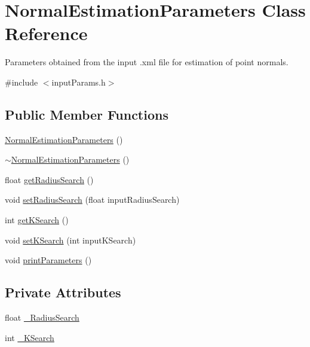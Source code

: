 \hypertarget{classNormalEstimationParameters}{\section{Normal\-Estimation\-Parameters Class Reference}
\label{classNormalEstimationParameters}
}


Parameters obtained from the input .xml file for estimation of point normals.  




{\ttfamily \#include $<$input\-Params.\-h$>$}

\subsection*{Public Member Functions}
\begin{DoxyCompactItemize}
\item 
\hyperlink{classNormalEstimationParameters_afdc5ed50adc78957f6e1473b46fdc027}{Normal\-Estimation\-Parameters} ()
\item 
\hyperlink{classNormalEstimationParameters_ae69baf3578ee90eee275e8557b7ab785}{$\sim$\-Normal\-Estimation\-Parameters} ()
\item 
float \hyperlink{classNormalEstimationParameters_ac85dfb4402e619e231252a550885e03e}{get\-Radius\-Search} ()
\item 
void \hyperlink{classNormalEstimationParameters_a09de127988c26f63802e5684ac820616}{set\-Radius\-Search} (float input\-Radius\-Search)
\item 
int \hyperlink{classNormalEstimationParameters_a6d60aefc1bf365dfb3535ca461f1ff42}{get\-K\-Search} ()
\item 
void \hyperlink{classNormalEstimationParameters_a2e155df55266a320e301353a29fdd545}{set\-K\-Search} (int input\-K\-Search)
\item 
void \hyperlink{classNormalEstimationParameters_af9fb36ee6ba828fa793258504c5944db}{print\-Parameters} ()
\end{DoxyCompactItemize}
\subsection*{Private Attributes}
\begin{DoxyCompactItemize}
\item 
float \hyperlink{classNormalEstimationParameters_a94b744776c5063bba3e4d7af2df102e4}{\-\_\-\-Radius\-Search}
\item 
int \hyperlink{classNormalEstimationParameters_a61b3161ffcd3eb6c4531f5dbc223a894}{\-\_\-\-K\-Search}
\end{DoxyCompactItemize}


